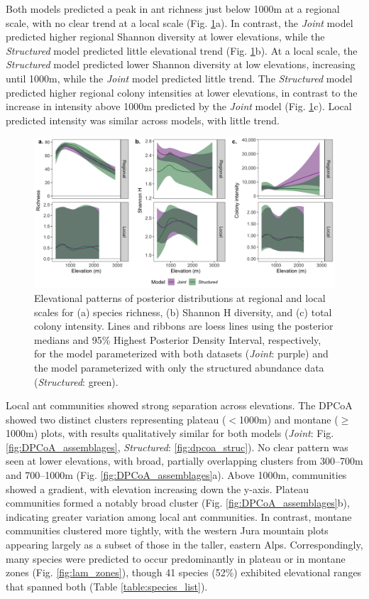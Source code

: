 \documentclass[preprint,final,times,12pt,3p]{elsarticle}
\begin{document}
Both models predicted a peak in ant richness just below 1000m at a regional scale, with no clear trend at a local scale (Fig. \ref{fig:el_patterns}a). In contrast, the \emph{Joint} model predicted higher regional Shannon diversity at lower elevations, while the \emph{Structured} model predicted little elevational trend (Fig. \ref{fig:el_patterns}b). At a local scale, the \emph{Structured} model predicted lower Shannon diversity at low elevations, increasing until 1000m, while the \emph{Joint} model predicted little trend. The \emph{Structured} model predicted higher regional colony intensities at lower elevations, in contrast to the increase in intensity above 1000m predicted by the \emph{Joint} model (Fig. \ref{fig:el_patterns}c). Local predicted intensity was similar across models, with little trend. 

\begin{figure}
	\centering\includegraphics[width=6in]{../../../ms/1_Ecography/1/figs/el_patterns.png}
	\caption{\label{fig:el_patterns} Elevational patterns of posterior distributions at regional and local scales for (a) species richness, (b) Shannon H diversity, and (c) total colony intensity. Lines and ribbons are loess lines using the posterior medians and 95\% Highest Posterior Density Interval, respectively, for the model parameterized with both datasets (\emph{Joint}: purple) and the model parameterized with only the structured abundance data (\emph{Structured}: green). }
\end{figure}


Local ant communities showed strong separation across elevations. The DPCoA showed two distinct clusters representing plateau ($<$1000m) and montane ($\geq$1000m) plots, with results qualitatively similar for both models (\emph{Joint}: Fig. \ref{fig:DPCoA_assemblages}, \emph{Structured}: \ref{fig:dpcoa_struc}). No clear pattern was seen at lower elevations, with broad, partially overlapping clusters from 300–700m and 700–1000m (Fig. \ref{fig:DPCoA_assemblages}a). Above 1000m, communities showed a gradient, with elevation increasing down the y-axis. Plateau communities formed a notably broad cluster (Fig. \ref{fig:DPCoA_assemblages}b), indicating greater variation among local ant communities. In contrast, montane communities clustered more tightly, with the western Jura mountain plots appearing largely as a subset of those in the taller, eastern Alps. Correspondingly, many species were predicted to occur predominantly in plateau or in montane zones (Fig. \ref{fig:lam_zones}), though 41 species (52\%) exhibited elevational ranges that spanned both (Table \ref{table:species_list}).
\end{document}
